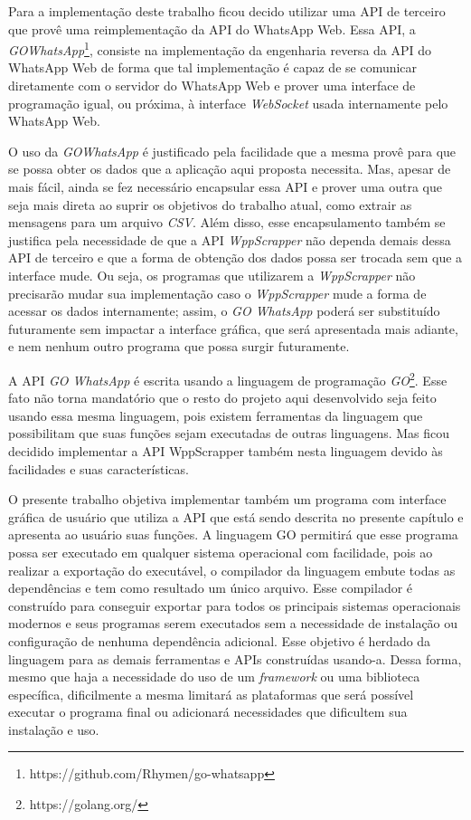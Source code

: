Para a implementação deste trabalho ficou decido utilizar uma API de terceiro que provê uma reimplementação da API do WhatsApp Web. Essa API, a \textit{GOWhatsApp}\footnote{https://github.com/Rhymen/go-whatsapp}, consiste na implementação da engenharia reversa da API do WhatsApp Web de forma que tal implementação é capaz de se comunicar diretamente com o servidor do WhatsApp Web e prover uma interface de programação igual, ou próxima, à interface \textit{WebSocket} usada internamente pelo WhatsApp Web.

O uso da \textit{GOWhatsApp} é justificado pela facilidade que a mesma provê para que se possa obter os dados que a aplicação aqui proposta necessita. Mas, apesar de mais fácil, ainda se fez necessário encapsular essa API e prover uma outra que seja mais direta ao suprir os objetivos do trabalho atual, como extrair as mensagens para um arquivo \textit{CSV}. Além disso, esse encapsulamento também se justifica pela necessidade de que a API \textit{WppScrapper} não dependa demais dessa API de terceiro e que a forma de obtenção dos dados possa ser trocada sem que a interface mude. Ou seja, os programas que utilizarem a \textit{WppScrapper} não precisarão mudar sua implementação caso o \textit{WppScrapper} mude a forma de acessar os dados internamente; assim, o \textit{GO WhatsApp} poderá ser substituído futuramente sem impactar a interface gráfica, que será apresentada mais adiante, e nem nenhum outro programa que possa surgir futuramente.

A API \textit{GO WhatsApp} é escrita usando a linguagem de programação \textit{GO}\footnote{https://golang.org/}. Esse fato não torna mandatório que o resto do projeto aqui desenvolvido seja feito usando essa mesma linguagem, pois existem ferramentas da linguagem que possibilitam que suas funções sejam executadas de outras linguagens. Mas ficou decidido implementar a API WppScrapper também nesta linguagem devido às facilidades e suas características. 

O presente trabalho objetiva implementar também um programa com interface gráfica de usuário que utiliza a API que está sendo descrita no presente capítulo e apresenta ao usuário suas funções. A linguagem GO permitirá que esse programa possa ser executado em qualquer sistema operacional com facilidade, pois ao realizar a exportação do executável, o compilador da linguagem embute todas as dependências e tem como resultado um único arquivo. Esse compilador é construído para conseguir exportar para todos os principais sistemas operacionais modernos e seus programas serem executados sem a necessidade de instalação ou configuração de nenhuma dependência adicional. Esse objetivo é herdado da linguagem para as demais ferramentas e APIs construídas usando-a. Dessa forma, mesmo que haja a necessidade do uso de um \textit{framework} ou uma biblioteca específica, dificilmente a mesma limitará as plataformas que será possível executar o programa final ou adicionará necessidades que dificultem sua instalação e uso.

